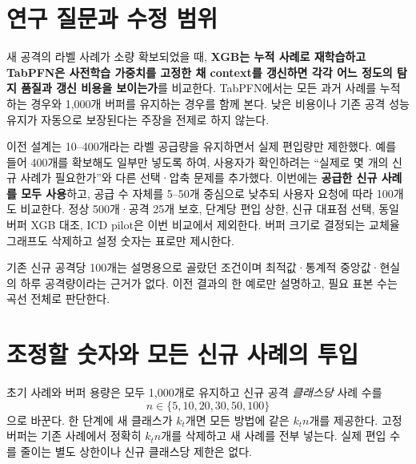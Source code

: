 


\section{연구 질문과 수정 범위}
새 공격의 라벨 사례가 소량 확보되었을 때, \textbf{XGB는 누적 사례로 재학습하고 TabPFN은 사전학습 가중치를 고정한 채 context를 갱신하면 각각 어느 정도의 탐지 품질과 갱신 비용을 보이는가}를 비교한다. TabPFN에서는 모든 과거 사례를 누적하는 경우와 1,000개 버퍼를 유지하는 경우를 함께 본다. 낮은 비용이나 기존 공격 성능 유지가 자동으로 보장된다는 주장을 전제로 하지 않는다.

이전 설계는 10--400개라는 라벨 공급량을 유지하면서 실제 편입량만 제한했다. 예를 들어 400개를 확보해도 일부만 넣도록 하여, 사용자가 확인하려는 ``실제로 몇 개의 신규 사례가 필요한가''와 다른 선택·압축 문제를 추가했다. 이번에는 \textbf{공급한 신규 사례를 모두 사용}하고, 공급 수 자체를 5--50개 중심으로 낮추되 사용자 요청에 따라 100개도 비교한다. 정상 500개·공격 25개 보호, 단계당 편입 상한, 신규 대표점 선택, 동일 버퍼 XGB 대조, ICD pilot은 이번 비교에서 제외한다. 버퍼 크기로 결정되는 교체율 그래프도 삭제하고 설정 숫자는 표로만 제시한다.

기존 신규 공격당 100개는 설명용으로 골랐던 조건이며 최적값·통계적 중앙값·현실의 하루 공격량이라는 근거가 없다. 이전 결과의 한 예로만 설명하고, 필요 표본 수는 곡선 전체로 판단한다.

\section{조정할 숫자와 모든 신규 사례의 투입}
초기 사례와 버퍼 용량은 모두 1,000개로 유지하고 신규 공격 \emph{클래스당} 사례 수를
\[
 n\in\{5,10,20,30,50,100\}
\]
으로 바꾼다. 한 단계에 새 클래스가 $k_t$개면 모든 방법에 같은 $k_tn$개를 제공한다. 고정 버퍼는 기존 사례에서 정확히 $k_tn$개를 삭제하고 새 사례를 전부 넣는다. 실제 편입 수를 줄이는 별도 상한이나 신규 클래스당 제한은 없다.


